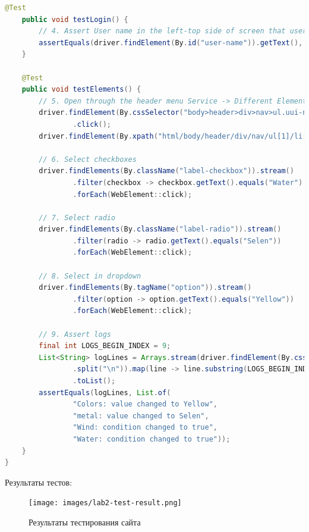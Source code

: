 \documentclass[a4paper]{article}
\begin{document}
\begin{lstlisting}[language=Java]
    @Test
    public void testLogin() {
        // 4. Assert User name in the left-top side of screen that user is loggined
        assertEquals(driver.findElement(By.id("user-name")).getText(), "ROMAN IOVLEV");
    }

    @Test
    public void testElements() {
        // 5. Open through the header menu Service -> Different Elements Page
        driver.findElement(By.cssSelector("body>header>div>nav>ul.uui-navigation.nav.navbar-nav.m-l8>li>a>span"))
                .click();
        driver.findElement(By.xpath("html/body/header/div/nav/ul[1]/li[3]/ul/li[8]/a")).click();

        // 6. Select checkboxes
        driver.findElements(By.className("label-checkbox")).stream()
                .filter(checkbox -> checkbox.getText().equals("Water") || checkbox.getText().equals("Wind"))
                .forEach(WebElement::click);

        // 7. Select radio
        driver.findElements(By.className("label-radio")).stream()
                .filter(radio -> radio.getText().equals("Selen"))
                .forEach(WebElement::click);

        // 8. Select in dropdown
        driver.findElements(By.tagName("option")).stream()
                .filter(option -> option.getText().equals("Yellow"))
                .forEach(WebElement::click);

        // 9. Assert logs
        final int LOGS_BEGIN_INDEX = 9;
        List<String> logLines = Arrays.stream(driver.findElement(By.cssSelector("ul.panel-body-list.logs")).getText()
                .split("\n")).map(line -> line.substring(LOGS_BEGIN_INDEX))
                .toList();
        assertEquals(logLines, List.of(
                "Colors: value changed to Yellow",
                "metal: value changed to Selen",
                "Wind: condition changed to true",
                "Water: condition changed to true"));
    }
}\end{lstlisting}
    Результаты тестов:
    \begin{figure}[H]
        \centering
        \begin{minipage}[t]{0.6\textwidth}
            \texttt{[image: images/lab2-test-result.png]}
        \end{minipage}
        \caption{Результаты тестирования сайта}
    \end{figure}
\end{document}

